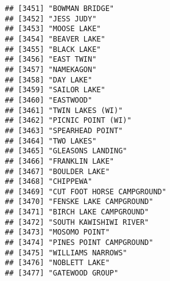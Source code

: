 \documentclass[
]{article}
\begin{document}
\begin{verbatim}
## [3451] "BOWMAN BRIDGE"                                                                       
## [3452] "JESS JUDY"                                                                           
## [3453] "MOOSE LAKE"                                                                          
## [3454] "BEAVER LAKE"                                                                         
## [3455] "BLACK LAKE"                                                                          
## [3456] "EAST TWIN"                                                                           
## [3457] "NAMEKAGON"                                                                           
## [3458] "DAY LAKE"                                                                            
## [3459] "SAILOR LAKE"                                                                         
## [3460] "EASTWOOD"                                                                            
## [3461] "TWIN LAKES (WI)"                                                                     
## [3462] "PICNIC POINT (WI)"                                                                   
## [3463] "SPEARHEAD POINT"                                                                     
## [3464] "TWO LAKES"                                                                           
## [3465] "GLEASONS LANDING"                                                                    
## [3466] "FRANKLIN LAKE"                                                                       
## [3467] "BOULDER LAKE"                                                                        
## [3468] "CHIPPEWA"                                                                            
## [3469] "CUT FOOT HORSE CAMPGROUND"                                                           
## [3470] "FENSKE LAKE CAMPGROUND"                                                              
## [3471] "BIRCH LAKE CAMPGROUND"                                                               
## [3472] "SOUTH KAWISHIWI RIVER"                                                               
## [3473] "MOSOMO POINT"                                                                        
## [3474] "PINES POINT CAMPGROUND"                                                              
## [3475] "WILLIAMS NARROWS"                                                                    
## [3476] "NOBLETT LAKE"                                                                        
## [3477] "GATEWOOD GROUP"                                                                      

\end{verbatim}
\end{document}
